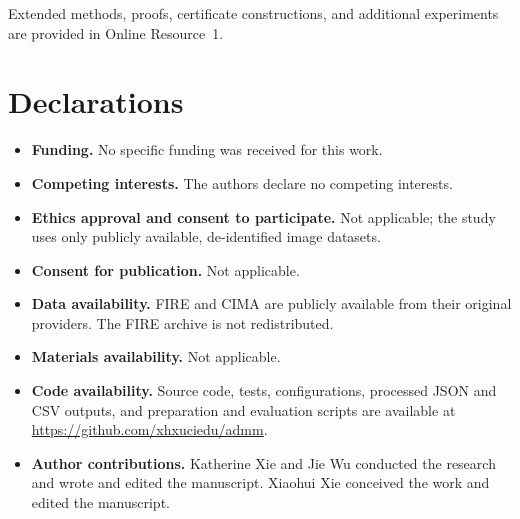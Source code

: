 \documentclass[pdflatex,iicol,sn-mathphys-num]{sn-jnl}
\theoremstyle{definition}
\begin{document}
\backmatter
{}
Extended methods, proofs, certificate constructions, and additional experiments are provided in Online Resource~1.

\section*{Declarations}
\begin{itemize}
\item \textbf{Funding.} No specific funding was received for this work.
\item \textbf{Competing interests.} The authors declare no competing interests.
\item \textbf{Ethics approval and consent to participate.} Not applicable; the
study uses only publicly available, de-identified image datasets.
\item \textbf{Consent for publication.} Not applicable.
\item \textbf{Data availability.} FIRE \cite{HernandezMatas2017} and CIMA
\cite{Borovec2018} are publicly available from their original providers. The
FIRE archive is not redistributed.
\item \textbf{Materials availability.} Not applicable.
\item \textbf{Code availability.} Source code, tests, configurations, processed
JSON and CSV outputs, and preparation and evaluation scripts are available at
\url{https://github.com/xhxuciedu/admm}.
\item \textbf{Author contributions.} Katherine Xie and Jie Wu conducted the
research and wrote and edited the manuscript. Xiaohui Xie conceived the work
and edited the manuscript.
\end{itemize}

\appendix
\end{document}
